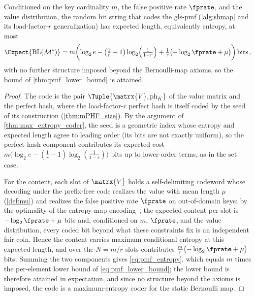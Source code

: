 \documentclass[ ../main.tex]{subfiles}
\begin{document}
\begin{theorem}
\label{thm:pmf_entropy}
Conditioned on the key cardinality $m$, the false positive rate $\fprate$, and the value distribution, the random bit string that codes the \gls{gls-pmf} (\cref{alg:shmap} and its load-factor-$r$ generalization) has expected length, equivalently entropy, at most
\begin{equation}
\label{eq:pmf_entropy}
    \Expect{\BL(\Mt^*)}
    = m\!\left(\log_2 e - \left(\tfrac{1}{r}-1\right)\log_2\!\left(\tfrac{1}{1-r}\right) + \tfrac{1}{r}\bigl(-\log_2\fprate + \mu\bigr)\right) \si{bits}\,,
\end{equation}
with no further structure imposed beyond the Bernoulli-map axioms, so the bound of \cref{thm:pmf_lower_bound} is attained.
\end{theorem}
\begin{proof}
The code is the pair $\Tuple{\matrx{V}, \ph_K}$ of the value matrix and the perfect hash, where the load-factor-$r$ perfect hash is itself coded by the seed of its construction (\cref{thm:mPHF_size}). By the argument of \cref{thm:max_entropy_coder}, the seed is a geometric index whose entropy and expected length agree to leading order (its bits are not exactly uniform), so the perfect-hash component contributes its expected cost $m\bigl(\log_2 e - (\tfrac{1}{r}-1)\log_2(\tfrac{1}{1-r})\bigr)$ bits up to lower-order terms, as in the set case.

For the content, each slot of $\matrx{V}$ holds a self-delimiting codeword whose decoding under the prefix-free code realizes the value with mean length $\mu$ (\cref{def:mu}) and realizes the false positive rate $\fprate$ on out-of-domain keys: by the optimality of the entropy-map encoding~\cite{bmaps,emaps}, the expected content per slot is $-\log_2\fprate + \mu$ bits and, conditioned on $m$, $\fprate$, and the value distribution, every coded bit beyond what these constraints fix is an independent fair coin. Hence the content carries maximum conditional entropy at this expected length, and over the $N = m/r$ slots contributes $\tfrac{m}{r}\bigl(-\log_2\fprate+\mu\bigr)$ bits. Summing the two components gives \cref{eq:pmf_entropy}, which equals $m$ times the per-element lower bound of \cref{eq:pmf_lower_bound}; the lower bound is therefore attained in expectation, and since no structure beyond the axioms is imposed, the code is a maximum-entropy coder for the static Bernoulli map.
\end{proof}
\end{document}
